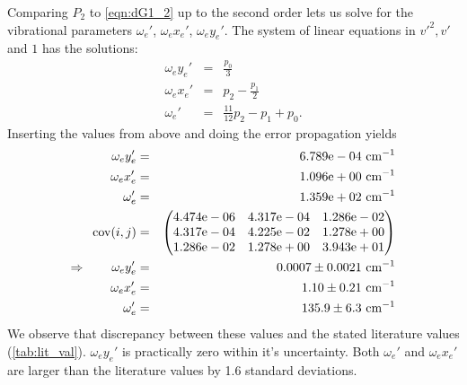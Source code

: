 Comparing $P_2$ to \eqref{eqn:dG1_2} up to the second order lets us solve for 
the vibrational parameters $\omega_e'$, $\omega_e x_e'$, $\omega_e y_e'$. The system of linear equations in 
${v'}^2, v'$ and $1$ has the solutions:
\begin{eqnarray}
    \omega_e y_e' &=& \frac{p_0}{3} \\
    \omega_e x_e' &=& p_2 - \frac{p_1}{2} \\
    \omega_e'     &=& \frac{11}{12}p_2 - p_1 + p_0.
\end{eqnarray}
Inserting the values from above and doing the error propagation yields 
\begin{eqnarray}
    \omega_e y_e' &=& 6.789\mathrm{e}-04 \ \mathrm{cm^{-1}} \nonumber \\
    \omega_e x_e' &=& 1.096\mathrm{e}+00 \ \mathrm{cm^{-1}} \nonumber \\
    \omega_e' &=& 1.359\mathrm{e}+02 \ \mathrm{cm^{-1}} \nonumber \\
    \mathrm{cov}(i, j) &=& 
    \begin{pmatrix}
        4.474\mathrm{e}-06 &4.317\mathrm{e}-04 &1.286\mathrm{e}-02 \\
        4.317\mathrm{e}-04 &4.225\mathrm{e}-02 &1.278\mathrm{e}+00 \\
        1.286\mathrm{e}-02 &1.278\mathrm{e}+00 &3.943\mathrm{e}+01 \\
    \end{pmatrix}
\\ \Rightarrow \qquad
    \omega_e y_e' &=& 0.0007 \pm 0.0021 \ \mathrm{cm^{-1}}\\
    \omega_e x_e' &=& 1.10 \pm 0.21 \ \mathrm{cm^{-1}}\\
    \omega_e' &=& 135.9 \pm 6.3 \ \mathrm{cm^{-1}}
\end{eqnarray} 
We observe that discrepancy between these values and the stated literature values 
(\ref{tab:lit_val}). $\omega_e y_e'$ is practically zero within it's uncertainty. 
Both $\omega_e'$ and $\omega_e x_e'$ are larger than the literature values by 
1.6 standard deviations. 


